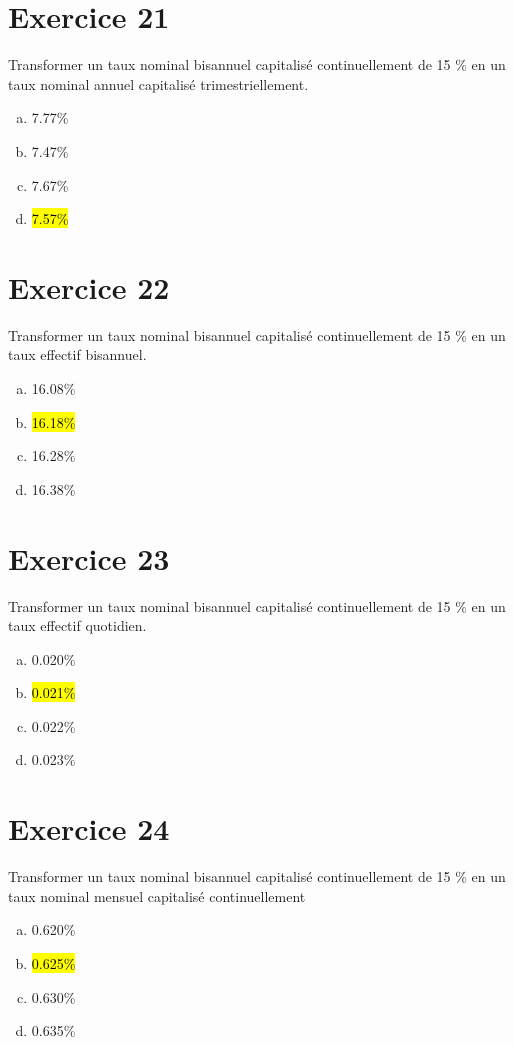 \documentclass[10pt,a4paper]{article}
\begin{document}
\section*{Exercice 21}
Transformer un taux nominal bisannuel capitalisé continuellement de 15 \% en un taux nominal annuel capitalisé trimestriellement.



\begin{enumerate}[a)]
\item 7.77\%
\item 7.47\%
\item 7.67\%
\item \hl{7.57\%}
\end{enumerate}

\section*{Exercice 22}
Transformer un taux nominal bisannuel capitalisé continuellement de 15 \% en un taux effectif bisannuel.



\begin{enumerate}[a)]
\item 16.08\%
\item \hl{16.18\%}
\item 16.28\%
\item 16.38\%
\end{enumerate}

\section*{Exercice 23}
Transformer un taux nominal bisannuel capitalisé continuellement de 15 \% en un taux effectif quotidien.



\begin{enumerate}[a)]
\item 0.020\%
\item \hl{0.021\%}
\item 0.022\%
\item 0.023\%
\end{enumerate}


\section*{Exercice 24}
Transformer un taux nominal bisannuel capitalisé continuellement de 15 \% en un taux nominal mensuel capitalisé continuellement



\begin{enumerate}[a)]
\item 0.620\%
\item \hl{0.625\%}
\item 0.630\%
\item 0.635\%
\end{enumerate}
\end{document}
